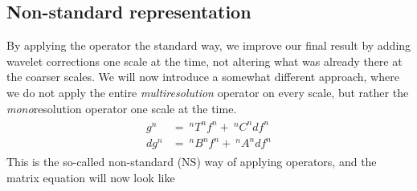 \subsection*{Non-standard representation}
By applying the operator the standard way, we improve our final result by 
adding wavelet corrections one scale at the time, not altering what was already
there at the coarser scales. We will now introduce a somewhat different 
approach, where we do not apply the entire \emph{multiresolution} operator on 
every scale, but rather the \emph{mono}resolution operator one scale at the 
time.
\begin{align}
	\label{eq:NSadapoper}
	\begin{split}
	g^n  &=\ ^nT^nf^n+\ ^nC^ndf^n\\
	dg^n &=\ ^nB^nf^n+\ ^nA^ndf^n
	\end{split}
\end{align}
This is the so-called non-standard (NS) way of applying operators, and the 
matrix equation will now look like

